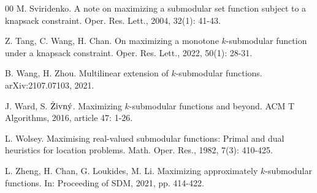 \documentclass[preprint,12pt]{elsarticle}
\begin{document}
\begin{thebibliography}{00}
M. Sviridenko.
A note on maximizing a submodular set function subject to a knapsack constraint.
Oper. Res. Lett., 2004, 32(1): 41-43.


Z. Tang, C. Wang, H. Chan.
On maximizing a monotone $k$-submodular function under a knapsack constraint.
Oper. Res. Lett., 2022, 50(1): 28-31.


B. Wang, H. Zhou.
Multilinear extension of $k$-submodular functions.
arXiv:2107.07103, 2021.


J. Ward, S. ${\rm\check{Z}ivn\acute{y}}$.
Maximizing $k$-submodular functions and beyond.
ACM T Algorithms, 2016, article 47: 1-26.

L. Wolsey.
Maximising real-valued submodular functions: Primal and dual heuristics for location problems.
Math. Oper. Res., 1982, 7(3): 410-425.

L. Zheng, H. Chan, G. Loukides, M. Li.
Maximizing approximately $k$-submodular functions.
In: Proceeding of SDM, 2021, pp. 414-422.

\end{thebibliography}
\end{document}
